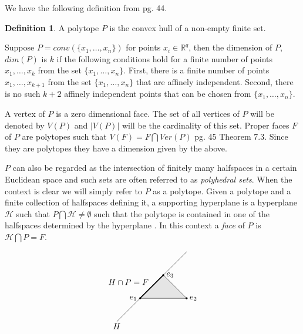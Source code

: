 \documentclass[oneside,12pt]{amsart}
\theoremstyle{definition}
\newtheorem{Definition}[Theorem]{Definition}
\numberwithin{equation}{section}
\begin{document}
We have the following definition from \cite{B}
pg. 44.

\begin{Definition}
A polytope $P$ is the convex hull of a non-empty finite set.
\end{Definition}

Suppose $P = conv(\{ x_1,\ldots,x_n \})$ for points $x_i \in \mathbb{R}^q$, then the dimension of $P$, $dim (P)$ is $k$ if the following conditions hold for a finite number of points $x_1,\ldots,x_k$ from the set $\{x_1,\ldots,x_n\}$.  First, there is a finite number of points $x_1,\ldots,x_{k+1}$ from the set $\{x_1,\ldots,x_n\}$ that are affinely independent.  Second, there is no such $k+2$ affinely independent points that can be chosen from $\{x_1,\ldots,x_n\}$.

A vertex of $P$ is a zero dimensional face.  The set of all vertices of $P$ will be denoted by $V(P)$ and $|V(P)|$ will be the cardinality of this set.  Proper faces $F$ of $P$ are polytopes such that $V(F) = F \bigcap Ver(P)$ \cite{B} pg. 45 Theorem 7.3.  Since they are polytopes they have a dimension given by the above.

$P$ can also be regarded as the intersection of finitely many halfspaces in a certain Euclidean space \cite{B, BP1} and such sets are often referred to as \textit{polyhedral sets}.  When the context is clear we will simply refer to $P$ as a polytope.  Given a polytope and a finite collection of halfspaces defining it, a supporting hyperplane is a hyperplane $\mathcal{H}$ such that $P \bigcap \mathcal{H} \neq \emptyset$ such that the polytope is contained in one of the halfspaces determined by the hyperplane \cite{BP1}. In this context a \textit{face} of $P$ is $\mathcal{H} \bigcap P = F$.

\begin{minipage}{\linewidth}
\small
$$\begin{tikzpicture}
\filldraw[color=gray!20] (-1,0)--(1,0)--(0,1)--(-1,0);
\draw (-1,0)--(1,0)--(0,1)--(-1,0);
\draw (-2,-1)--(1,2);
\draw[very thick] (-1,0)--(0,1);
\filldraw[black] (-1,0) node[left=.1pt]{$e_1$} circle (1pt);
\filldraw[black] (1,0) node[right=.1pt]{$e_2$} circle (1pt);
\filldraw[black] (0,1) node[ right=.1pt]{$e_3$} circle (1pt);
\draw (-2,-1.2) node{$H$} ;
\draw (-1.5,.7) node{$H\cap P=F$} ;
\end{tikzpicture}$$
\normalsize
\end{minipage}\\[2ex]
\end{document}

